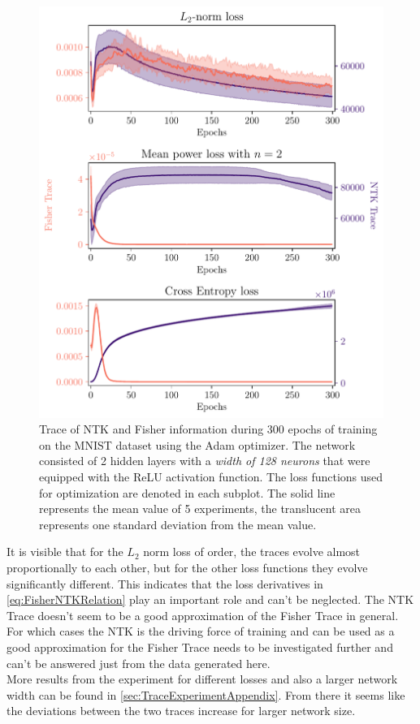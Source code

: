 \begin{figure}
	\centering
	\includegraphics{text/results/FisherNTKComparisonPlots/Triple_comparison_losses2_128.pdf}
	\caption{Trace of NTK and Fisher information during 300 epochs of training on the MNIST dataset using the Adam optimizer. The network consisted of 2 hidden layers with a \emph{width of 128 neurons} that were equipped with the ReLU activation function. The loss functions used for optimization are denoted in each subplot. The solid line represents the mean value of 5 experiments, the translucent area represents one standard deviation from the mean value.}
	\label{fig:MNISTTraceComparison}
\end{figure}
It is visible that for the $L_2$ norm loss of order, the traces evolve almost proportionally to each other, but for the other loss functions they evolve significantly different. This indicates that the loss derivatives in \cref{eq:FisherNTKRelation} play an important role and can't be neglected. The NTK Trace doesn't seem to be a good approximation of the Fisher Trace in general. For which cases the NTK is the driving force of training and can be used as a good approximation for the Fisher Trace needs to be investigated further and can't be answered just from the data generated here.\\
More results from the experiment for different losses and also a larger network width can be found in \cref{sec:TraceExperimentAppendix}. From there it seems like the deviations between the two traces increase for larger network size. 